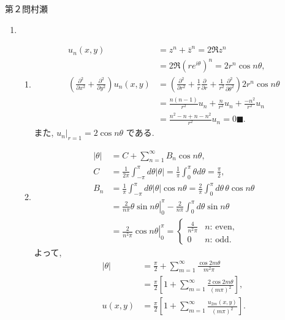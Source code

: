 \begin{answer}{第２問}{村瀬}
\begin{enumerate}
\item
  \begin{enumerate}
  \item
    \begin{align*}
      u_n(x,y) &= z^n + \bar z^n = 2 \Re z^n\\
        &= 2\Re (re^{i\theta})^n = 2 r^n \cos n\theta,\\
      \left(\frac{\partial^2}{\partial x^2} + \frac{\partial^2}{\partial y^2}\right) u_n(x,y)
        &= \left(\frac{\partial^2}{\partial r^2}
          +\frac1r\frac{\partial}{\partial r}
          +\frac1{r^2}\frac{\partial^2}{\partial \theta^2}\right) 2 r^n \cos n\theta\\
        &= \frac{n(n-1)}{r^2} u_n + \frac{n}{r^2} u_n + \frac{-n^2}{r^2} u_n\\
        &= \frac{n^2 -n + n -n^2}{r^2} u_n = 0\text{■}.
    \end{align*}
    また, $u_n|_{r=1} = 2\cos n\theta$ である.

  \item
    \begin{align*}
      |\theta| &= C + \sum_{n=1}^\infty B_n \cos n\theta,\\
      C
       &= \frac1{2\pi} \int_{-\pi}^\pi d\theta |\theta|
        = \frac1\pi \int_0^\pi \theta d\theta = \frac\pi2,\\
      B_n
       &= \frac1{\pi}\int_{-\pi}^\pi d\theta |\theta|\cos n\theta
        = \frac2{\pi} \int_0^\pi d\theta\, \theta\cos n\theta\\
       &= \left. \frac2{n\pi} \theta\sin n\theta \right|_0^\pi
          - \frac2{n\pi}\int_0^\pi d\theta \sin n\theta\\
       &= \left. \frac2{n^2\pi}\cos n\theta \right|_0^\pi
        = \begin{cases}
          \frac4{n^2\pi} & \text{$n$: even},\\
          0 & \text{$n$: odd}.
        \end{cases}
    \end{align*}
    よって,
    \begin{align*}
      |\theta|
        &= \frac\pi2 + \sum_{m=1}^\infty \frac{\cos 2m\theta}{m^2\pi}\\
        &= \frac\pi2 \left[ 1 + \sum_{m=1}^\infty \frac{2\cos 2m\theta}{(m\pi)^2} \right],\\
      u(x,y)
        &= \frac\pi2 \left[ 1 + \sum_{m=1}^\infty \frac{u_{2m}(x,y) }{(m\pi)^2} \right].
    \end{align*}
    

\end{enumerate}
\end{enumerate}
\end{answer}
